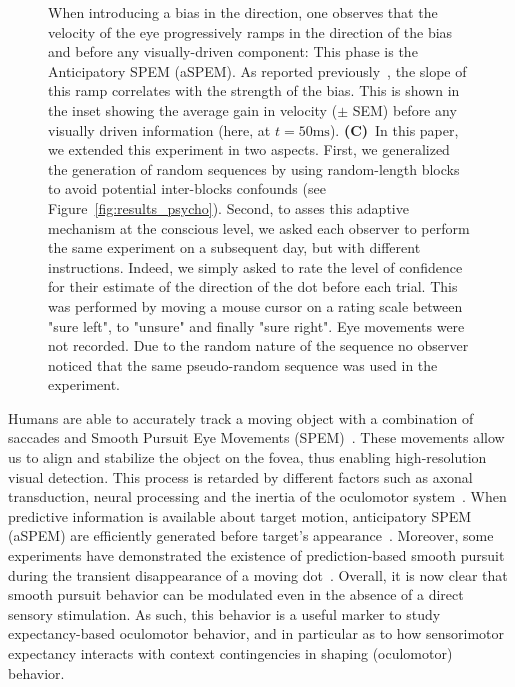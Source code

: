 \documentclass[profile,final,english, draft]{article}%
\newcommand{\ms}{\si{\milli\second}}%
\newcommand{\citep}[1]{\parencite{#1}}
\newcommand{\seeFig}[1]{see Figure~\ref{fig:#1}}
\begin{document}
\begin{figure}
{When introducing a bias in the direction,
one observes that the velocity of the eye progressively ramps
in the direction of the bias and before any visually-driven component:
This phase is the Anticipatory SPEM (aSPEM).
As reported previously~\citep{Montagnini2010, SantosKowler2017},
the slope of this ramp correlates with the strength of the bias.
This is shown in the inset showing the average gain in velocity ($\pm$ SEM)
before any visually driven information (here, at $t=50 \ms$).
\textbf{(C)}~In this paper, we extended this experiment in two aspects.
First, we generalized the generation of random sequences
by using random-length blocks
to avoid potential inter-blocks confounds (\seeFig{results_psycho}).
Second, to asses this adaptive mechanism at the conscious level,
we asked each observer to perform the same experiment on a subsequent day,
but with different instructions.
Indeed, we simply asked to rate the level of confidence
for their estimate of the direction of the dot before each trial.
This was performed by moving a mouse cursor on a rating scale
between "sure left", to "unsure" and finally "sure right".
Eye movements were not recorded.
Due to the random nature of the sequence no observer noticed
that the same pseudo-random sequence was used in the experiment.
}
\label{fig:intro}
\end{figure}
Humans are able to accurately track a moving object
with a combination of saccades and
Smooth Pursuit Eye Movements (SPEM)~\citep{ref}.
These movements allow us to align and
stabilize the object on the fovea,
thus enabling high-resolution visual detection.
This process is retarded by different factors such as axonal transduction,
neural processing and the inertia of the oculomotor system~\citep{Krauzlis}.
When predictive information is available about target motion,
anticipatory SPEM (aSPEM) are
efficiently generated before target's appearance~\citep{Westheimer1954, Kowler1979a, Kowler1979b}.
Moreover, some experiments have demonstrated the existence
of prediction-based smooth pursuit during
the transient disappearance of a moving dot~\citep{Badler2006,BeckerFuchs1985}.
Overall, it is now clear that smooth pursuit behavior
can be modulated even in the absence of a direct sensory stimulation.
As such, this behavior is a useful marker 
to study expectancy-based oculomotor behavior,
and in particular as to how sensorimotor expectancy interacts
with context contingencies in shaping (oculomotor) behavior.
\end{document}
